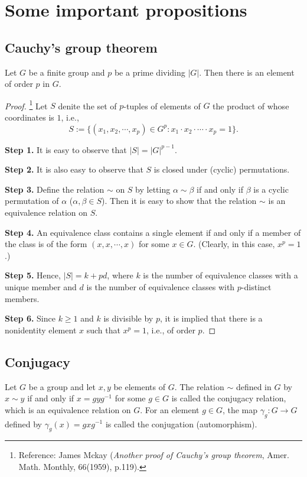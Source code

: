 \section{Some important propositions}

\subsection{Cauchy's group theorem}
\begin{thm}
    Let $G$ be a finite group and $p$ be a prime dividing $|G|$.
    Then there is an element of order $p$ in $G$.
\end{thm}
\begin{proof}\footnote{Reference: James Mckay (\textit{Another proof of Cauchy's group theorem}, Amer. Math. Monthly, 66(1959), p.119).}
    Let $S$ denite the set of $p$-tuples of elements of $G$ the product of whose coordinates is $1$, i.e.,
    \begin{equation*}
        S:=\{(x_1, x_2, \cdots, x_p)\in G^p: x_1\cdot x_2\cdot\cdots\cdot x_p=1\}.
    \end{equation*}

    \textbf{Step 1.}
    It is easy to observe that $|S|=|G|^{p-1}$.

    \textbf{Step 2.}
    It is also easy to observe that $S$ is closed under (cyclic) permutations.
        
    \textbf{Step 3.}
    Define the relation $\sim$ on $S$ by letting $\alpha\sim\beta$ if and only if $\beta$ is a cyclic permutation of $\alpha$ ($\alpha, \beta\in S$).
    Then it is easy to show that the relation $\sim$ is an equivalence relation on $S$.
    
    \textbf{Step 4.}
    An equivalence class contains a single element if and only if a member of the class is of the form $(x, x, \cdots, x)$ for some $x\in G$. (Clearly, in this case, $x^p=1$.)

    \textbf{Step 5.}
    Hence, $|S|=k+pd$, where $k$ is the number of equivalence classes with a unique member and $d$ is the number of equivalence classes with $p$-distinct members.

    \textbf{Step 6.}
    Since $k\geq 1$ and $k$ is divisible by $p$, it is implied that there is a nonidentity element $x$ such that $x^p=1$, i.e., of order $p$.
\end{proof}

\subsection{Conjugacy}
\begin{defi}[Conjugacy]
    Let $G$ be a group and let $x, y$ be elements of $G$.
    The relation $\sim$ defined in $G$ by $x\sim y$ if and only if $x=gyg^{-1}$ for some $g\in G$ is called the conjugacy relation, which is an equivalence relation on $G$.
    For an element $g\in G$, the map $\gamma_g: G\rightarrow G$ defined by $\gamma_g(x)=gxg^{-1}$ is called the conjugation (automorphism).
\end{defi}

